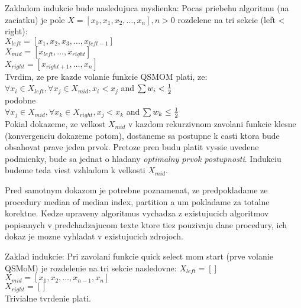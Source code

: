\documentclass[paper=a4, fontsize=11pt]{scrartcl} %
\numberwithin{equation}{section} %
\numberwithin{figure}{section} %
\numberwithin{table}{section} %
\begin{document}
Zakladom indukcie bude nasledujuca myslienka:
Pocas priebehu algoritmu (na zaciatku) je pole $X = [x_0, x_1, x_2, \dots, x_n], n > 0$ rozdelene na tri sekcie (left < right): \\
$X_{left} = [x_1, x_2, x_3, \dots, x_{left-1}]$\\
$X_{mid} = [x_{left}, \dots, x_{right}]$\\
$X_{right} = [x_{right+1}, \dots, x_n]$\\
Tvrdim, ze pre kazde volanie funkcie QSMOM plati, ze:\\
$\forall x_i \in X_{left}, \forall x_j \in X_{mid}, x_i < x_j$ and $ \sum w_i < \frac{1}{2} \\$ \\
podobne \\
$\forall x_j \in X_{mid}, \forall x_k \in X_{right}, x_j < x_k$ and $ \sum w_k \leq \frac{1}{2} \\$ \\

Pokial dokazeme, ze velkost $X_{mid}$ v kazdom rekurzivnom zavolani funkcie klesne (konvergenciu dokazeme potom), dostaneme sa postupne k casti ktora bude obsahovat prave jeden prvok. Pretoze pren budu platit vyssie uvedene podmienky, bude sa jednat o hladany {\em optimalny prvok postupnosti}. Indukciu budeme teda viest vzhladom k velkosti $X_{mid}$.

Pred samotnym dokazom je potrebne poznamenat, ze predpokladame ze procedury median of median index, partition a um pokladame za totalne korektne. Kedze upraveny algoritmus vychadza z existujucich algoritmov popisanych v predchadzajucom texte ktore tiez pouzivaju dane procedury, ich dokaz je mozne vyhladat v existujucich zdrojoch.

Zaklad indukcie:
Pri zavolani funkcie quick select mom start (prve volanie QSMoM) je rozdelenie na tri sekcie nasledovne:
$X_{left} = []$\\
$X_{mid} = [x_1, x_2, \dots, x_{n-1}, x_n]$\\
$X_{right} = []$\\
Trivialne tvrdenie plati. \\
\end{document}
